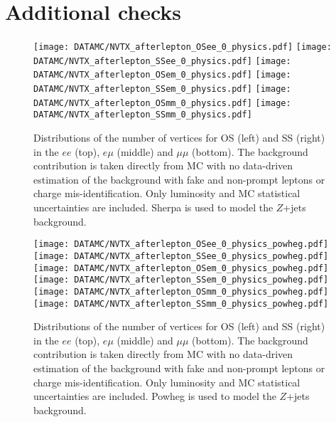 \FloatBarrier
\clearpage
\section{Additional checks}
\label{appendix:pileup_checks}

\begin{figure}[htb!]
\centering
{\texttt{[image: DATAMC/NVTX\_afterlepton\_OSee\_0\_physics.pdf]}}
{\texttt{[image: DATAMC/NVTX\_afterlepton\_SSee\_0\_physics.pdf]}}
{\texttt{[image: DATAMC/NVTX\_afterlepton\_OSem\_0\_physics.pdf]}}
{\texttt{[image: DATAMC/NVTX\_afterlepton\_SSem\_0\_physics.pdf]}}
{\texttt{[image: DATAMC/NVTX\_afterlepton\_OSmm\_0\_physics.pdf]}}
{\texttt{[image: DATAMC/NVTX\_afterlepton\_SSmm\_0\_physics.pdf]}}
\caption{Distributions of the number of vertices for OS (left) and SS (right) in the $ee$ (top), $e\mu$ (middle) and $\mu\mu$ (bottom). The background contribution is taken directly from MC with no data-driven estimation of the background with fake and non-prompt leptons or charge mis-identification. Only luminosity and MC statistical uncertainties are included. Sherpa is used to model the $Z$+jets background.
}
\label{fig:app_Nvtx}
\end{figure}

\begin{figure}[htb!]
\centering
{\texttt{[image: DATAMC/NVTX\_afterlepton\_OSee\_0\_physics\_powheg.pdf]}}
{\texttt{[image: DATAMC/NVTX\_afterlepton\_SSee\_0\_physics\_powheg.pdf]}}
{\texttt{[image: DATAMC/NVTX\_afterlepton\_OSem\_0\_physics\_powheg.pdf]}}
{\texttt{[image: DATAMC/NVTX\_afterlepton\_SSem\_0\_physics\_powheg.pdf]}}
{\texttt{[image: DATAMC/NVTX\_afterlepton\_OSmm\_0\_physics\_powheg.pdf]}}
{\texttt{[image: DATAMC/NVTX\_afterlepton\_SSmm\_0\_physics\_powheg.pdf]}}
\caption{Distributions of the number of vertices for OS (left) and SS (right) in the $ee$ (top), $e\mu$ (middle) and $\mu\mu$ (bottom). The background contribution is taken directly from MC with no data-driven estimation of the background with fake and non-prompt leptons or charge mis-identification. Only luminosity and MC statistical uncertainties are included. Powheg is used to model the $Z$+jets background.
}
\label{fig:app_Nvtx_powheg}
\end{figure}

